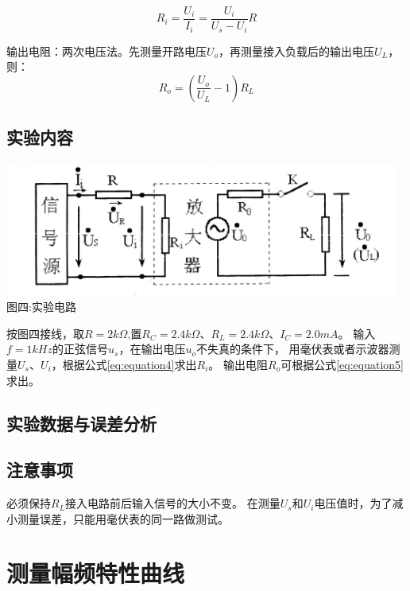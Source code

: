 \documentclass[a4paper]{article}
\begin{document}
    \begin{equation}
        R_i=\frac{U_i}{I_i}=\frac{U_i}{U_s-U_i}R\label{eq:equation4}
    \end{equation}

    {{输出电阻：两次电压法。先测量开路电压$U_o$，再测量接入负载后的输出电压$U_L$，则：}}
    \begin{equation}
        R_o=(\frac{U_o}{U_L}-1)R_L\label{eq:equation5}
    \end{equation}

    \subsection{实验内容}\label{subsec:10}
    \begin{center}
        \includegraphics[height=125pt]{R}\\
        {\small 图四:实验电路}
    \end{center}

    {{按图四接线，取$R=2k\Omega$,置$R_C=2.4k\Omega$、$R_L=2.4k\Omega$、$I_C=2.0mA$。
    输入$f=1kHz$的正弦信号$u_s$，在输出电压$u_o$不失真的条件下，
    用毫伏表或者示波器测量$U_s$、$U_i$，根据公式\eqref{eq:equation4}求出$R_i$。}}
    {{输出电阻$R_o$可根据公式\eqref{eq:equation5}求出。}}

    \subsection{实验数据与误差分析}\label{subsec:11}

    \subsection{注意事项}\label{subsec:12}
    {{必须保持$R_L$接入电路前后输入信号的大小不变。}}
    {{在测量$U_s$和$U_i$电压值时，为了减小测量误差，只能用毫伏表的同一路做测试。}}
    \vspace{1cm}


    \section{测量幅频特性曲线}\label{sec:6}
\end{document}
